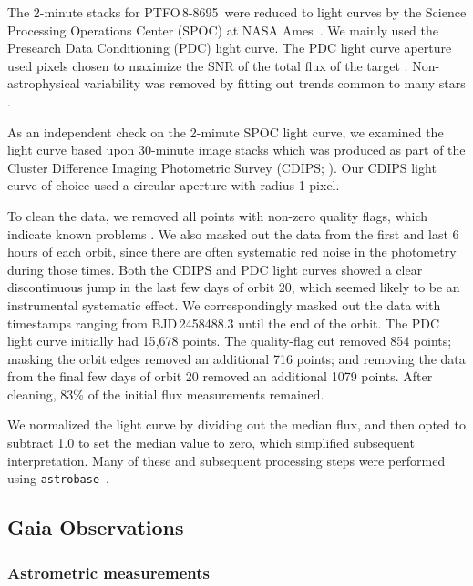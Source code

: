 \documentclass[12pt,twocolumn,tighten]{aastex62}
\newcommand{\ptfo}{PTFO$\,$8-8695}
\begin{document}
The 2-minute stacks for \ptfo\ were reduced to light curves by the
Science Processing Operations Center (SPOC) at NASA
Ames~\citep{jenkins_tess_2016}.  We mainly used the Presearch Data
Conditioning (PDC) light curve.  The PDC light curve aperture used
pixels chosen to maximize the SNR of the total flux of the target
\citep{bryson_2020_target_aperture}.  Non-astrophysical variability
was removed by fitting out trends common to many stars
\citep{smith_kepler_2012,stumpe_multiscale_2014}.

As an independent check on the 2-minute SPOC light curve, we examined
the light curve based upon 30-minute image stacks which was produced as
part of the Cluster Difference Imaging Photometric Survey (CDIPS;
\citealt{bouma_cluster_2019}).  Our CDIPS light curve of choice used a
circular aperture with radius 1 pixel.

To clean the data, we removed all points with non-zero quality flags,
which indicate known problems \citep[{\it
e.g.},][]{tess_data_product_description_2018}.  We also masked out the
data from the first and last 6 hours of each orbit, since there are
often systematic red noise in the photometry during those times.  Both
the CDIPS and PDC light curves showed a clear discontinuous jump in the
last few days of orbit 20, which seemed likely to be an instrumental
systematic effect.  We correspondingly masked out the data with
timestamps ranging from BJD\,2458488.3 until the end of the orbit.
The PDC light curve initially had 15{,}678 points.  The quality-flag
cut removed 854 points; masking the orbit edges removed an additional
716 points; and removing the data from the final few days of orbit 20
removed an additional 1079 points.  After cleaning, 83\% of the
initial flux measurements remained.

We normalized the light curve by dividing out the median flux, and then
opted to subtract 1{.}0 to set the median value to zero, which
simplified subsequent interpretation.  Many of these and subsequent
processing steps were performed using
\texttt{astrobase}~\citep{bhatti_astrobase_2018}. 


\subsection{Gaia Observations}

\subsubsection{Astrometric measurements}
\end{document}
